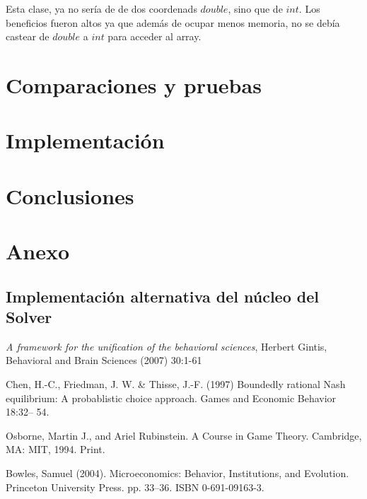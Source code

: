 \documentclass[10pt,a4paper,notitlepage,draft]{article}
\begin{document}
    Esta clase, ya no sería de de dos coordenads $double$, sino que de $int$. Los beneficios fueron altos ya que además de ocupar menos memoria, no se debía castear de $double$ a $int$ para acceder al array.







\section{Comparaciones y pruebas}
\section{Implementación}
\section{Conclusiones}
\section{Anexo}
\subsection{Implementación alternativa del núcleo del Solver}
\begin{thebibliography}{9}
   \emph{A framework for the unification of the behavioral sciences}, Herbert Gintis, Behavioral and Brain Sciences (2007) 30:1-61

   Chen, H.-C., Friedman, J. W. \& Thisse, J.-F. (1997) Boundedly rational Nash
equilibrium: A probablistic choice approach. Games and Economic Behavior
18:32– 54.

   Osborne, Martin J., and Ariel Rubinstein. A Course in Game Theory. Cambridge, MA: MIT, 1994. Print.

   Bowles, Samuel (2004). Microeconomics: Behavior, Institutions, and Evolution. Princeton University Press. pp. 33–36. ISBN 0-691-09163-3.
\end{thebibliography}
\end{document}

